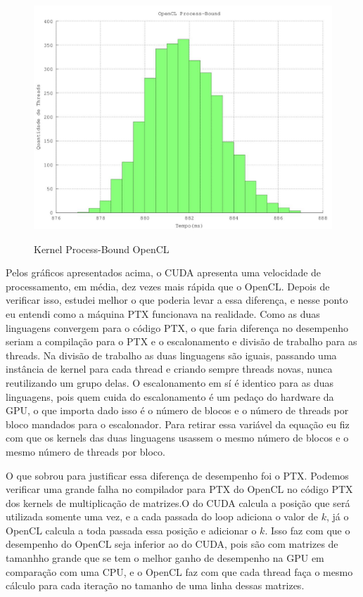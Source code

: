 \begin{figure}[H]
  \begin{center}
    \includegraphics[scale=0.6]{resultados_opencl_process_histo.jpg}
    \label{fig:Kernel Process-Bound OpenCL}
    \caption{Kernel Process-Bound OpenCL}
  \end{center}
\end{figure}

Pelos gráficos apresentados acima, o CUDA apresenta uma velocidade de processamento, em média, dez vezes mais rápida que o OpenCL.
Depois de verificar isso, estudei melhor o que poderia levar a essa diferença, e nesse ponto eu entendi como a máquina PTX funcionava 
na realidade. Como as duas linguagens convergem para o código PTX, o que faria diferença no desempenho seriam
a compilação para o PTX e o escalonamento e divisão de trabalho para as threads. Na divisão de trabalho as duas linguagens
são iguais, passando uma instância de kernel para cada thread e criando sempre threads novas, nunca reutilizando um grupo delas.
O escalonamento em sí é identico para as duas linguagens, pois quem cuida do escalonamento é um pedaço do hardware da GPU, o que
importa dado isso é o número de blocos e o número de threads por bloco mandados para o escalonador. Para retirar essa variável da equação
eu fiz com que os kernels das duas linguagens usassem o mesmo número de blocos e o mesmo número de threads por bloco.

O que sobrou para justificar essa diferença de desempenho foi o PTX. Podemos verificar uma grande falha no compilador para PTX do OpenCL
no código PTX dos kernels de multiplicação de matrizes.O do CUDA calcula a posição que será utilizada somente uma vez, e a cada passada
do loop adiciona o valor de $k$, já o OpenCL calcula a toda passada essa posição e adicionar o $k$. Isso faz com que o desempenho do
OpenCL seja inferior ao do CUDA, pois são com matrizes de tamanhho grande que se tem o melhor ganho de desempenho na GPU em comparação
com uma CPU, e o OpenCL faz com que cada thread faça o mesmo cálculo para cada iteração no tamanho de uma linha dessas matrizes.

